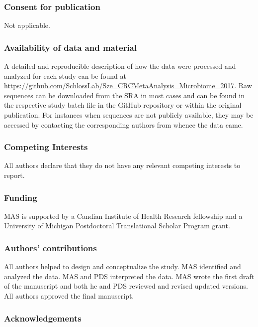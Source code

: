 \documentclass[12pt,]{article}
\begin{document}
\subsubsection{Consent for publication}\label{consent-for-publication}

Not applicable.

\subsubsection{Availability of data and
material}\label{availability-of-data-and-material}

A detailed and reproducible description of how the data were processed
and analyzed for each study can be found at
\url{https://github.com/SchlossLab/Sze_CRCMetaAnalysis_Microbiome_2017}.
Raw sequences can be downloaded from the SRA in most cases and can be
found in the respective study batch file in the GitHub repository or
within the original publication. For instances when sequences are not
publicly available, they may be accessed by contacting the corresponding
authors from whence the data came.

\subsubsection{Competing Interests}\label{competing-interests}

All authors declare that they do not have any relevant competing
interests to report.

\subsubsection{Funding}\label{funding}

MAS is supported by a Candian Institute of Health Research fellowship
and a University of Michigan Postdoctoral Translational Scholar Program
grant.

\subsubsection{Authors' contributions}\label{authors-contributions}

All authors helped to design and conceptualize the study. MAS identified
and analyzed the data. MAS and PDS interpreted the data. MAS wrote the
first draft of the manuscript and both he and PDS reviewed and revised
updated versions. All authors approved the final manuscript.

\subsubsection{Acknowledgements}\label{acknowledgements}
\end{document}

